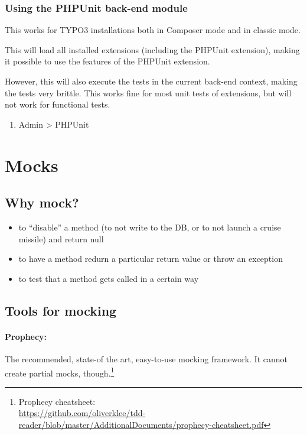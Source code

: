 \documentclass[a4paper,10pt,headsepline]{scrartcl}
\begin{document}
\subsubsection{Using the PHPUnit back-end module}

This works for TYPO3 installations both in Composer mode and in classic mode.

This will load all installed extensions (including the PHPUnit extension), making it possible to use the features of the PHPUnit extension.

However, this will also execute the tests in the current back-end context, making the tests very brittle. This works fine for most unit tests of extensions, but will not work for functional tests.

\begin{enumerate}
  \item Admin > PHPUnit
\end{enumerate}



\pagebreak
\section{Mocks}

\subsection{Why mock?}
\begin{itemize}
  \item to ``disable'' a method (to not write to the DB, or to not launch a cruise missile) and return null
  \item to have a method redurn a particular return value or throw an exception
  \item to test that a method gets called in a certain way
\end{itemize}

\subsection{Tools for mocking}

\paragraph{Prophecy:} The recommended, state-of the art, easy-to-use mocking framework. It cannot create partial mocks, though.\footnote{Prophecy cheatsheet:\\ \url{https://github.com/oliverklee/tdd-reader/blob/master/AdditionalDocuments/prophecy-cheatsheet.pdf}}
\end{document}
